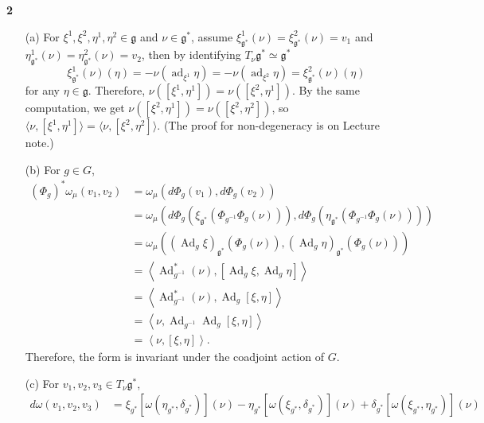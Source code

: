 \documentclass[a4paper, 12pt]{article}
\theoremstyle{Mydefinition}
\theoremstyle{Mytheorem}
\DeclareMathOperator{\Ad}{Ad}
\DeclareMathOperator{\ad}{ad}
\begin{document}
\noindent \textbf{2}
\begin{enumerate}
    \item[(a)]For $\xi^1,\xi^2,\eta^1,\eta^2\in \mathfrak{g}$ and $\nu\in\mathfrak{g}^*$, assume $\xi^1_{\mathfrak{g}^*}(\nu) = \xi^2_{\mathfrak{g}^*}(\nu)=v_1$ and $\eta^1_{\mathfrak{g}^*}(\nu) = \eta^2_{\mathfrak{g}^*}(\nu)=v_2$, then by identifying $T_\nu \mathfrak{g}^*\simeq \mathfrak{g}^*$
    \begin{equation*}
        \xi^1_{\mathfrak{g}^*}(\nu)(\eta) = -\nu(\ad_{\xi^1}\eta)=-\nu(\ad_{\xi^2}\eta) = \xi^2_{\mathfrak{g}^*}(\nu)(\eta)
    \end{equation*}
    for any $\eta\in\mathfrak{g}$. Therefore, $\nu([\xi^1, \eta^1])=\nu([\xi^2, \eta^1])$. By the same computation, we get $\nu([\xi^2, \eta^1]) = \nu([\xi^2, \eta^2])$, so $\langle \nu, [\xi^1, \eta^1]\rangle = \langle \nu, [\xi^2, \eta^2]\rangle$. (The proof for non-degeneracy is on Lecture note.)
    \item[(b)] For $g\in G$,
    \begin{equation*}
    \begin{split}
        (\Phi_g)^*\omega_\mu(v_1, v_2) &= \omega_\mu(d\Phi_g(v_1), d\Phi_g(v_2)) \\
        &=\omega_\mu\left(d\Phi_g\left(\xi_{\mathfrak{g}^*}\left(\Phi_{g^{-1}}\Phi_{g}(\nu)\right)\right),d\Phi_g\left(\eta_{\mathfrak{g}^*}\left(\Phi_{g^{-1}}\Phi_{g}(\nu)\right)\right)\right)\\
        &=\omega_\mu\left((\Ad_g\xi)_{\mathfrak{g}^*}\left(\Phi_{g}(\nu)\right),(\Ad_g\eta)_{\mathfrak{g}^*}\left(\Phi_{g}(\nu)\right)\right)\\
        &=\left\langle \Ad_{g^{-1}}^*(\nu), [\Ad_g\xi, \Ad_g\eta] \right\rangle\\
        &=\left\langle \Ad_{g^{-1}}^*(\nu), \Ad_g[\xi, \eta] \right\rangle\\
        &=\left\langle \nu, \Ad_{g^{-1}}\Ad_g[\xi, \eta] \right\rangle\\
        &=\left\langle \nu, [\xi, \eta] \right\rangle.
    \end{split}
    \end{equation*}
    Therefore, the form is invariant under the coadjoint action of $G$.
    \item[(c)] For $v_1,v_2,v_3\in T_\nu\mathfrak{g}^*$,
    \begin{equation*}
    \begin{split}
        d\omega(v_1,v_2,v_3) &= \xi_{g^*}[\omega(\eta_{g^*}, \delta_{g^*})](\nu) - \eta_{g^*}[\omega(\xi_{g^*}, \delta_{g^*})](\nu) + \delta_{g^*}[\omega(\xi_{g^*}, \eta_{g^*})](\nu)\\

\end{split}
\end{equation*}
\end{enumerate}
\end{document}
